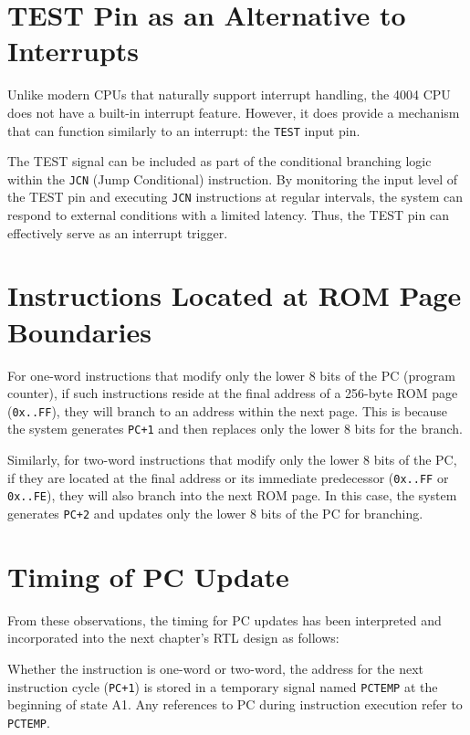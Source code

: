\section{TEST Pin as an Alternative to Interrupts}
Unlike modern CPUs that naturally support interrupt handling, the 4004 CPU does not have a built-in interrupt feature. However, it does provide a mechanism that can function similarly to an interrupt: the \texttt{TEST} input pin.

The TEST signal can be included as part of the conditional branching logic within the \texttt{JCN} (Jump Conditional) instruction. By monitoring the input level of the TEST pin and executing \texttt{JCN} instructions at regular intervals, the system can respond to external conditions with a limited latency. Thus, the TEST pin can effectively serve as an interrupt trigger.

\section{Instructions Located at ROM Page Boundaries}
For one-word instructions that modify only the lower 8 bits of the PC (program counter), if such instructions reside at the final address of a 256-byte ROM page (\texttt{0x..FF}), they will branch to an address within the next page. This is because the system generates \texttt{PC+1} and then replaces only the lower 8 bits for the branch.

Similarly, for two-word instructions that modify only the lower 8 bits of the PC, if they are located at the final address or its immediate predecessor (\texttt{0x..FF} or \texttt{0x..FE}), they will also branch into the next ROM page. In this case, the system generates \texttt{PC+2} and updates only the lower 8 bits of the PC for branching.

\section{Timing of PC Update}
From these observations, the timing for PC updates has been interpreted and incorporated into the next chapter's RTL design as follows:

Whether the instruction is one-word or two-word, the address for the next instruction cycle (\texttt{PC+1}) is stored in a temporary signal named \texttt{PCTEMP} at the beginning of state A1. Any references to PC during instruction execution refer to \texttt{PCTEMP}.

